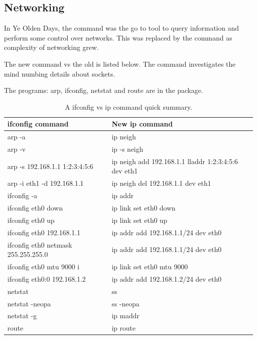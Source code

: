 \subsection{Networking}  \label{sec:UnixUserNetworking}

In Ye Olden Days, the  command was the go to tool to
query information and perform some control over networks. This
was replaced by the  command as complexity of networking
grew.

The new  command vs the old  is listed below.
The   command investigates the mind
numbing details about sockets.

The programs: arp, ifconfig, netstat and route are in the 
package.

\begin{table}[h!]
\centering
\begingroup \fontsize{10pt}{10pt}
\selectfont
\begin{tabular}{| l | l |}
\hline
ifconfig command & New ip command   \\
\hline
arp -a                              & ip neigh    \\ 
arp -v                              & ip -s neigh    \\ 
arp -s 192.168.1.1 1:2:3:4:5:6      & ip neigh add 192.168.1.1 lladdr 1:2:3:4:5:6 dev eth1    \\ 
arp -i eth1 -d 192.168.1.1          & ip neigh del 192.168.1.1 dev eth1    \\ 
ifconfig -a                         & ip addr    \\ 
ifconfig eth0 down                  & ip link set eth0 down    \\ 
ifconfig eth0 up                    & ip link set eth0 up    \\ 
ifconfig eth0 192.168.1.1           & ip addr add 192.168.1.1/24 dev eth0    \\ 
ifconfig eth0 netmask 255.255.255.0 & ip addr add 192.168.1.1/24 dev eth0    \\ 
ifconfig eth0 mtu 9000 i            & ip link set eth0 mtu 9000    \\ 
ifconfig eth0:0 192.168.1.2         & ip addr add 192.168.1.2/24 dev eth0    \\ 
netstat                             & ss    \\ 
netstat -neopa                      & ss -neopa    \\ 
netstat -g                          & ip maddr    \\ 
route                               & ip route    \\ 
\hline
\end{tabular}
\endgroup
\caption[Net-tools vs IProute2]{A ifconfig vs ip command quick summary.}
\label{table:ifconfigvsipcommand}
\end{table}
